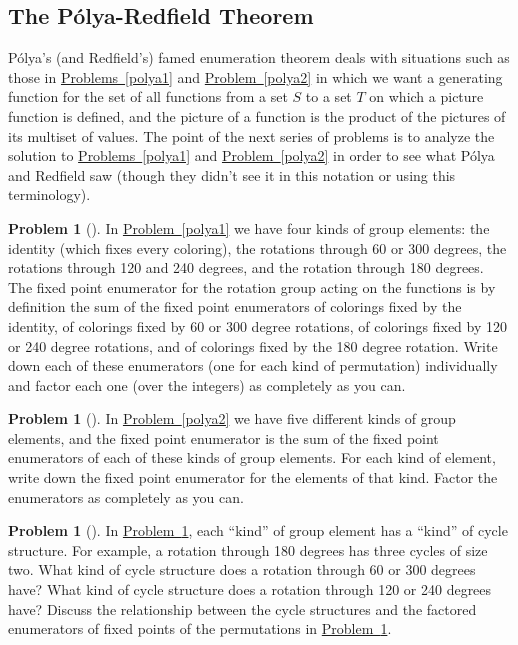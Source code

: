 \documentclass[10pt,]{book}
\theoremstyle{plain}
\theoremstyle{definition}
\newtheorem{activity}[project]{Problem}
\theoremstyle{definition}
\numberwithin{equation}{chapter}
\begin{document}
\subsection[{The Pólya-Redfield Theorem}]{The Pólya-Redfield Theorem}\label{subsection-69}
\hypertarget{p-1759}{}%
Pólya's (and Redfield's) famed enumeration theorem deals with situations such as those in \hyperref[polya1]{Problems~\ref{polya1}} and \hyperref[polya2]{Problem~\ref{polya2}} in which we want a generating function for the set of all functions from a set \(S\) to a set \(T\) on which a picture function is defined, and the picture of a function is the product of the pictures of its multiset of values. The point of the next series of problems is to analyze the solution to \hyperref[polya1]{Problems~\ref{polya1}} and \hyperref[polya2]{Problem~\ref{polya2}} in order to see what Pólya and Redfield saw (though they didn't see it in this notation or using this terminology).%
\begin{activity}[] \label{polya3}
\hypertarget{p-1760}{}%
In \hyperref[polya1]{Problem~\ref{polya1}} we have four kinds of group elements: the identity (which fixes every coloring), the rotations through 60 or 300 degrees, the rotations through 120 and 240 degrees, and the rotation through 180 degrees. The fixed point enumerator for the rotation group acting on the functions is by definition the sum of the fixed point enumerators of colorings fixed by the identity, of colorings fixed by 60 or 300 degree rotations, of colorings fixed by 120 or 240 degree rotations, and of colorings fixed by the 180 degree rotation. Write down each of these enumerators (one for each kind of permutation) individually and factor each one (over the integers) as completely as you can.%
\end{activity}
\begin{activity}[] \label{polya4}
\hypertarget{p-1762}{}%
In \hyperref[polya2]{Problem~\ref{polya2}} we have five different kinds of group elements, and the fixed point enumerator is the sum of the fixed point enumerators of each of these kinds of group elements. For each kind of element, write down the fixed point enumerator for the elements of that kind. Factor the enumerators as completely as you can.%
\end{activity}
\begin{activity}[] \label{polya3_5}
\hypertarget{p-1764}{}%
In \hyperref[polya3]{Problem~\ref{polya3}}, each ``kind'' of group element has a ``kind'' of cycle structure. For example, a rotation through 180 degrees has three cycles of size two. What kind of cycle structure does a rotation through 60 or 300 degrees have? What kind of cycle structure does a rotation through 120 or 240 degrees have? Discuss the relationship between the cycle structures and the factored enumerators of fixed points of the permutations in \hyperref[polya3]{Problem~\ref{polya3}}.%
\end{activity}
\end{document}
